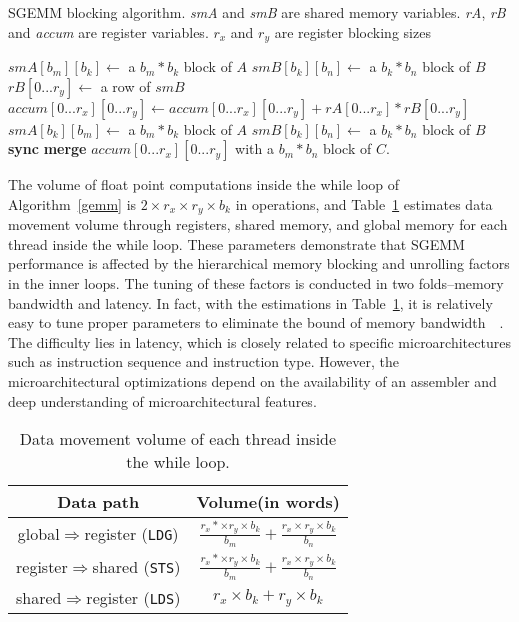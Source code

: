 \begin{algorithm}
  \caption{SGEMM blocking algorithm. {\em smA} and {\em smB} are shared memory variables. {\em rA}, {\em rB} and {\em 
accum} are register variables. $r_x$ and $r_y$ are register blocking sizes}
  \label{gemm}
  \begin{algorithmic}[1]
	\State $smA[b_m][b_k] \gets$ a $b_m * b_k$ block of $A$
	\State $smB[b_k][b_n] \gets$ a $b_k * b_n$ block of $B$
	\Do
      \State {\color {black} {$rA[0...r_x]\gets$ a column of $smA$}}
	\State $rB[0...r_y]\gets$ a row of $smB$
	\State $accum[0...r_x][0...r_y]\gets accum[0...r_x][0...r_y]+rA[0...r_x]*rB[0...r_y]$
	\EndFor
	\State $smA[b_k][b_m]\gets$ a $b_m*b_k$ block of $A$
	\State $smB[b_k][b_n]\gets$ a $b_k*b_n$ block of $B$
	\State \textbf{sync}
	\State \textbf{merge} $accum[0...r_x][0...r_y]$ with a $b_m*b_n$ block of $C$.
  \end{algorithmic}
\end{algorithm}

The volume of float point computations inside the while loop of Algorithm~\ref{gemm} is $2\times r_x\times r_y \times b_k$ 
in operations, and Table~\ref{tab:dm} estimates data movement volume through registers, shared memory, and global 
memory for each thread inside the while loop.
These parameters demonstrate that SGEMM performance is affected by the hierarchical memory blocking and unrolling 
factors in the inner loops.
The tuning of these factors is conducted in two folds--memory bandwidth and latency. In fact, with the estimations in 
Table~\ref{tab:dm}, it is relatively easy to tune proper parameters to eliminate the bound of memory 
bandwidth~\cite{magma}~\cite{tan}. The difficulty lies in latency, which is closely related to specific 
microarchitectures such as instruction sequence and instruction type. However, the microarchitectural 
optimizations depend on the availability of an assembler and deep understanding of microarchitectural features.

\begin{table}[htbp]
    \caption{Data movement volume of each thread inside the while loop.} %
\centering
\scalebox{1.0} {
\begin{tabular}{|c|c|}
\hline
    Data path& Volume(in words)\\
\hline
    global$\Rightarrow$register ({\tt LDG})& $\frac{r_x*\times r_y \times b_k}{b_m} + \frac{r_x\times r_y \times b_k}{b_n}$ \\
\hline
register$\Rightarrow$shared ({\tt STS})& $\frac{r_x*\times r_y \times b_k}{b_m} + \frac{r_x\times r_y \times b_k}{b_n}$ \\
\hline
shared$\Rightarrow$register ({\tt LDS})& $r_x\times b_k + r_y\times b_k$\\
\hline
\end{tabular}
}
\label{tab:dm}
\end{table}
